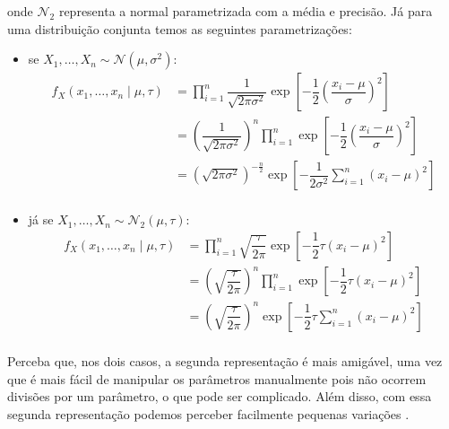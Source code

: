 \documentclass{article}
\begin{document}
\noindent onde $\mathcal{N}_2$ representa a normal parametrizada com a média e precisão. Já para uma distribuição conjunta temos as seguintes parametrizações:
\begin{itemize}
    \item
        se $X_1, \dots, X_n \sim \mathcal{N}(\mu, \sigma^2)$:
        \begin{equation*}
            \begin{split}
                f_X(x_1, \dots, x_n \mid \mu, \tau) & = \prod_{i = 1}^{n} \dfrac{1}{\sqrt{2\pi \sigma^2}}\exp{\left[-\dfrac{1}{2}\left(\dfrac{x_i - \mu}{\sigma}\right)^2\right]} \\
                & = \left(\dfrac{1}{\sqrt{2\pi \sigma^2}}\right)^n \prod_{i = 1}^{n} \exp{\left[-\dfrac{1}{2}\left(\dfrac{x_i - \mu}{\sigma}\right)^2\right]} \\
                & = \left(\sqrt{2\pi \sigma^2}\right)^{-\frac{n}{2}} \exp{\left[-\dfrac{1}{2\sigma^2}\sum_{i = 1}^{n}\left(x_i - \mu\right)^2\right]} \\
            \end{split}
        \end{equation*}
        
    \item
        já se $X_1, \dots, X_n \sim \mathcal{N}_2(\mu, \tau)$:
        \begin{equation}
            \label{eq1}
            \begin{split}
                f_X(x_1, \dots, x_n \mid \mu, \tau) & = \prod_{i = 1}^{n} \sqrt{\dfrac{\tau}{2\pi}}\exp{\left[-\dfrac{1}{2}\tau(x_i - \mu)^2\right]} \\
                & = \left(\sqrt{\dfrac{\tau}{2\pi}}\right)^n \prod_{i = 1}^{n} \exp{\left[-\dfrac{1}{2}\tau\left(x_i - \mu\right)^2\right]} \\
                & = \left(\sqrt{\dfrac{\tau}{2\pi}}\right)^n \exp{\left[-\dfrac{1}{2}\tau\sum_{i = 1}^{n}\left(x_i - \mu\right)^2\right]} \\
            \end{split}
        \end{equation}
\end{itemize}

Perceba que, nos dois casos, a segunda representação é mais amigável, uma vez que é mais fácil de manipular os parâmetros manualmente pois não ocorrem divisões por um parâmetro, o que pode ser complicado. Além disso, com essa segunda representação podemos perceber facilmente pequenas variações \cite{stackexchange}.
\end{document}
